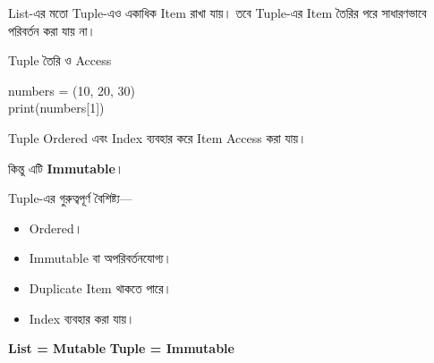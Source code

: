 

List-এর মতো Tuple-এও একাধিক Item রাখা যায়। তবে Tuple-এর Item
তৈরির পরে সাধারণভাবে পরিবর্তন করা যায় না।

\begin{codeoutputbox}{Tuple তৈরি ও Access}

\noindent
\begin{minipage}[t]{0.53\linewidth}
\codeheading

\begin{english}
\ttfamily
numbers = (10, 20, 30)\\
print(numbers[1])
\end{english}

\end{minipage}
\hfill
\begin{minipage}[t]{0.43\linewidth}
\outputheading

\begin{center}
\textenglish{}
\end{center}

Tuple Ordered এবং Index ব্যবহার করে Item Access করা যায়।

কিন্তু এটি \textbf{Immutable}।

\end{minipage}

\end{codeoutputbox}

Tuple-এর গুরুত্বপূর্ণ বৈশিষ্ট্য—

\begin{itemize}

\item Ordered।

\item Immutable বা অপরিবর্তনযোগ্য।

\item Duplicate Item থাকতে পারে।

\item Index ব্যবহার করা যায়।

\end{itemize}

\begin{rememberbox}

\begin{center}

\textbf{List = Mutable}
\qquad
\textbf{Tuple = Immutable}

\end{center}

\end{rememberbox}

